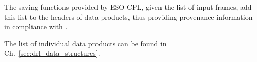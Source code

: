 The saving-functions provided by ESO \ac{CPL}, given the list of input frames, add this list to the headers of data products, thus providing provenance information in compliance with .

The list of individual data products can be found in
Ch.~\ref{sec:drl_data_structures}.


